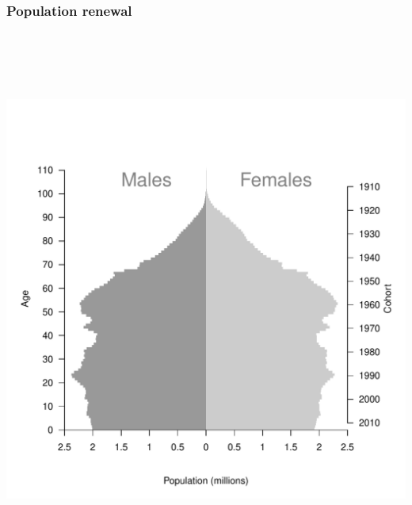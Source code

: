 \documentclass[20pt]{beamer}
\begin{document}
\begin{frame}
\frametitle{Population renewal}
\vspace{-2em}
\begin{center}
\includegraphics[height=7in,trim=20 20 20 20]{Figures/PopUSA2014.pdf}
\end{center}
\end{frame}
\end{document}
